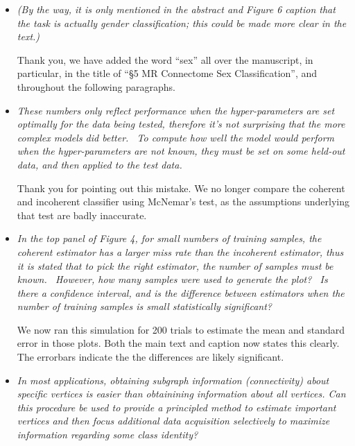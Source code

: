 \begin{itemize}
	
	\item \emph{(By the way, it is only mentioned in the abstract and Figure 6 caption that the task is actually gender classification; this could be made more clear in the text.)   }
	
	Thank you, we have added the word ``sex'' all over the manuscript, in particular, in the title of ``\S 5 MR Connectome Sex Classification'', and throughout the following paragraphs.
	
	\item \emph{These numbers only reflect performance when the hyper-parameters are set optimally for the data being tested, therefore it's not surprising that the more complex models did better.  To compute how well the model would perform when the hyper-parameters are not known, they must be set on some held-out data, and then applied to the test data. } 
	
	Thank you for pointing out this mistake.  We no longer compare the coherent and incoherent classifier using McNemar's test, as the assumptions underlying that test are badly inaccurate. 
	
	\item \emph{In the top panel of Figure 4, for small numbers of training samples, the coherent estimator has a larger miss rate than the incoherent estimator, thus it is stated that to pick the right estimator, the number of samples must be known.  However, how many samples were used to generate the plot?  Is there a confidence interval, and is the difference between estimators when the number of training samples is small statistically significant?}
	
	We now ran this simulation for 200 trials to estimate the mean and standard error in those plots.  Both the main text and caption now states this clearly.  The errorbars indicate the the differences are likely significant.
	
	
	
	\item \emph{In most applications, obtaining subgraph information (connectivity) about specific vertices is easier than obtainining information about all vertices. Can this procedure be used to provide a principled method to estimate important vertices and then focus additional data acquisition selectively to maximize information regarding some class identity?}
	

\end{itemize}
